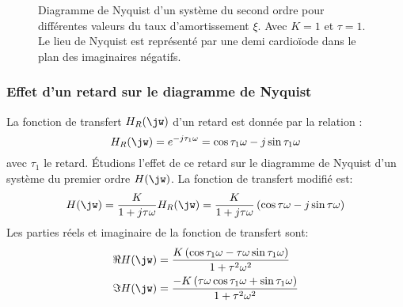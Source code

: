 \begin{figure}[!h]
\begin{center}
\end{center}
\caption{Diagramme de Nyquist d'un système du second ordre pour différentes valeurs du 
    taux d'amortissement $\xi$. Avec $K=1$ et $\tau=1$. Le lieu de Nyquist est 
    représenté par une demi cardio\"iode dans le plan des imaginaires négatifs.\label{fig-nyquist_2nd_2}}
\end{figure}

\newpage
\subsubsection{Effet d'un retard sur le diagramme de Nyquist}
La fonction de transfert $H_R(\jw)$ d'un retard est donnée par la relation :
$$
H_R(\jw)=e^{-j\tau_1\omega}=\cos{\tau_1\omega}-j\sin{\tau_1\omega}
$$
avec $\tau_1$ le retard. 
\'Etudions l'effet de ce retard sur le diagramme de Nyquist d'un système du premier ordre $H(\jw)$.
La fonction de transfert modifié est:
$$
H(\jw)=\dfrac{K}{1+j\tau\omega}H_R(\jw)=\dfrac{K}{1+j\tau\omega}\left(\cos{\tau\omega}-j\sin{\tau\omega}\right)
$$
Les parties réels et imaginaire de la fonction de transfert sont:
\begin{align*}
    \Re{H(\jw)}&=\dfrac{K\left(\cos{\tau_1\omega-\tau\omega\sin{\tau_1\omega}}\right)}{1+\tau^2\omega^2}\\
    \Im{H(\jw)}&=\dfrac{-K\left(\tau\omega\cos{\tau_1\omega+\sin{\tau_1\omega}}\right)}{1+\tau^2\omega^2}\\
\end{align*}


